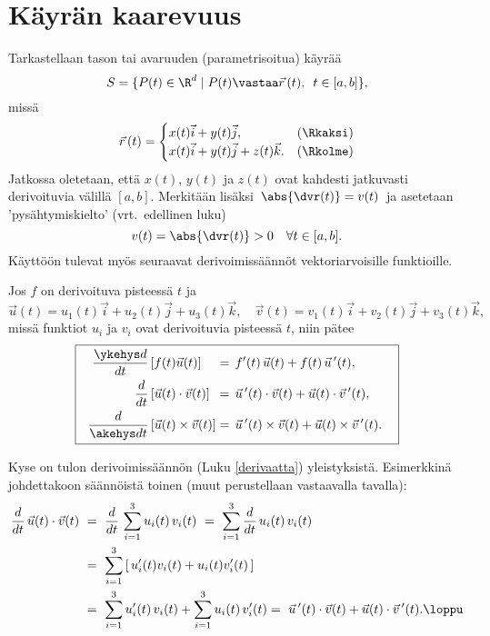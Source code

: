 \section{Käyrän kaarevuus} \label{käyrän kaarevuus}
\alku
{}

Tarkastellaan tason tai avaruuden (parametrisoitua) käyrää
\[
S=\{P(t) \in \R^d \mid P(t) \vastaa \vec r\,(t),\,\ t\in [a,b]\},
\]
missä
\[
\vec r\,(t) = \begin{cases}
x(t)\vec i + y(t)\vec j, &(\Rkaksi) \\
x(t)\vec i + y(t)\vec j + z(t)\vec k. &(\Rkolme)
\end{cases}
\]
Jatkossa oletetaan, että $x(t)$, $y(t)$ ja $z(t)$ ovat kahdesti jatkuvasti derivoituvia
välillä $[a,b]$. Merkitään lisäksi $\,\abs{\dvr(t)}=v(t)\,$ ja asetetaan 'pysähtymiskielto'
(vrt.\ edellinen luku)
\begin{equation} \label{derivaattaehto}
v(t)=\abs{\dvr(t)}>0 \quad\forall t\in [a,b].
\end{equation}
Käyttöön tulevat myös seuraavat derivoimissäännöt vektoriarvoisille funktioille.
\begin{Prop} \label{vektorifunktioiden tulon derivointi} Jos $f$ on derivoituva pisteessä
$t$ ja
\[ 
\vec u(t) = u_1(t)\vec i + u_2(t)\vec j + u_3(t)\vec k, \quad 
\vec v(t) = v_1(t)\vec i + v_2(t)\vec j + v_3(t)\vec k, 
\]
missä funktiot $u_i$ ja $v_i$ ovat derivoituvia pisteessä $t$, niin pätee
\[ \boxed{ \begin{aligned}
\quad \frac{\ykehys d}{dt}\left[f(t)\vec u(t)\right] \quad\, 
            &=\,f'(t)\,\vec u(t) + f(t)\,\vec u\,'(t), \\
\frac{d}{dt}\left[\vec u(t)\cdot\vec v(t)\right]\,\          
            &=\,\vec u\,'(t)\cdot\vec v(t) + \vec u(t)\cdot\vec v\,'(t), \\
\frac{d}{\akehys dt}\left[\vec u(t)\times\vec v(t)\right]    
            &=\,\vec u\,'(t)\times\vec v(t) + \vec u(t)\times\vec v\,'(t). \quad
\end{aligned} } \]
\end{Prop}
\tod Kyse on tulon derivoimissäännön (Luku \ref{derivaatta}) yleistyksistä. Esimerkkinä
johdettakoon säännöistä toinen (muut perustellaan vastaavalla tavalla):
\begin{align*} 
\frac{d}{dt}\,\vec u(t)\cdot\vec v(t)\ 
               &=\ \frac{d}{dt}\,\sum_{i=1}^3 u_i(t)\,v_i(t)\ 
                =\ \sum_{i=1}^3 \frac{d}{dt}\,u_i(t)\,v_i(t) \\
               &=\ \sum_{i=1}^3\left[\,u_i'(t)v_i(t)+u_i(t)v_i'(t)\,\right] \\
               &=\ \sum_{i=1}^3 u_i'(t)\,v_i(t) + \sum_{i=1}^3 u_i(t)\,v_i'(t)
                =\ \vec u\,'(t)\cdot\vec v(t) + \vec u(t)\cdot\vec v\,'(t). \loppu
\end{align*}

